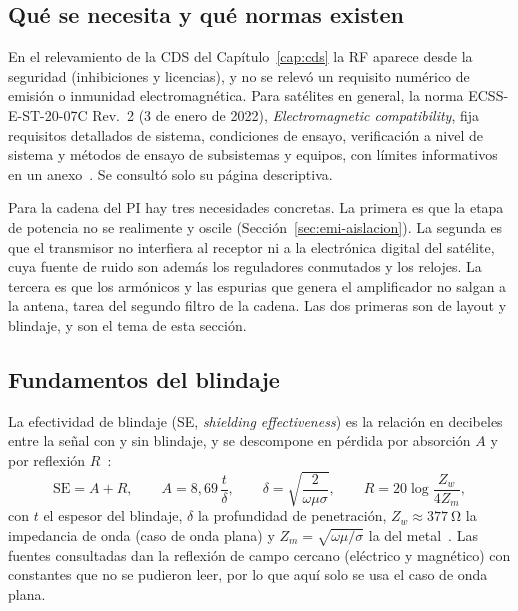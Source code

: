 \subsection{Qué se necesita y qué normas existen}\label{sec:emi-normas}

En el relevamiento de la CDS del Capítulo~\ref{cap:cds} la RF aparece desde la seguridad (inhibiciones y licencias), y no se relevó un requisito numérico de emisión o inmunidad electromagnética. Para satélites en general, la norma ECSS-E-ST-20\nobreakdash-07C Rev.~2 (3 de enero de 2022), \emph{Electromagnetic compatibility}, fija requisitos detallados de sistema, condiciones de ensayo, verificación a nivel de sistema y métodos de ensayo de subsistemas y equipos, con límites informativos en un anexo~\cite{ecss2007}. Se consultó solo su página descriptiva. 

Para la cadena del PI hay tres necesidades concretas. La primera es que la etapa de potencia no se realimente y oscile (Sección~\ref{sec:emi-aislacion}). La segunda es que el transmisor no interfiera al receptor ni a la electrónica digital del satélite, cuya fuente de ruido son además los reguladores conmutados y los relojes. La tercera es que los armónicos y las espurias que genera el amplificador no salgan a la antena, tarea del segundo filtro de la cadena. Las dos primeras son de layout y blindaje, y son el tema de esta sección.

\subsection{Fundamentos del blindaje}\label{sec:emi-fundamentos}

La efectividad de blindaje (SE, \emph{shielding effectiveness}) es la relación en decibeles entre la señal con y sin blindaje, y se descompone en pérdida por absorción $A$ y por reflexión $R$~\cite{rosehulman}:
\begin{equation}\label{eq:emi-se}
  \mathrm{SE} = A + R, \qquad A = 8{,}69\,\frac{t}{\delta}, \qquad \delta = \sqrt{\frac{2}{\omega\mu\sigma}}, \qquad R = 20\log \frac{Z_w}{4 Z_m},
\end{equation}
con $t$ el espesor del blindaje, $\delta$ la profundidad de penetración, $Z_w \approx \SI{377}{\ohm}$ la impedancia de onda (caso de onda plana) y $Z_m = \sqrt{\omega\mu/\sigma}$ la del metal~\cite{rosehulman}. Las fuentes consultadas dan la reflexión de campo cercano (eléctrico y magnético) con constantes que no se pudieron leer, por lo que aquí solo se usa el caso de onda plana.

